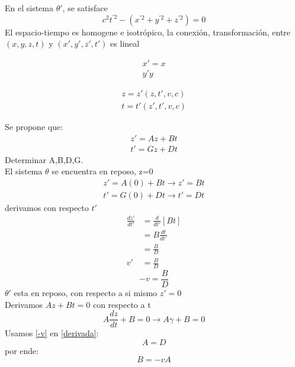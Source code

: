 \documentclass[12pt,letterpaper]{report}
\begin{document}
En el sistema $\theta'$, se satisface
\begin{equation*}
    c^{2}t^{'2}-(x^{'2}+y^{'2}+z^{'2})=0
\end{equation*}
El espacio-tiempo es homogene e isotrópico, la conexión, transformación, entre $(x,y,z,t)$ y $(x',y',z',t')$ es lineal\\
\begin{minipage}{0.5\linewidth}
\begin{eqnarray*}
    x'=x\\
    y'y
\end{eqnarray*}
\end{minipage}
\begin{minipage}{0.5\linewidth}
\begin{eqnarray*}
    z=z'(z,t',v,c)\\
    t=t'(z',t',v,c)
\end{eqnarray*}
\end{minipage}
Se propone que:
\begin{eqnarray}
    \label{sistema}
    z'=Az+Bt\\
    t'=Gz+Dt
    \label{sistemas}
\end{eqnarray}
Determinar A,B,D,G.\\
El sistema $\theta$ se encuentra en reposo, z=0
\begin{eqnarray}
    z'=A(0)+Bt \rightarrow z'=Bt \\
    t'=G(0)+Dt \rightarrow t'=Dt
\end{eqnarray}
derivamos con respecto $t'$
\begin{align*}
    \frac{dz'}{dt'} &=\frac{d}{dt'}[Bt]\\
                    &=B\frac{dt}{dt'}\\
                    & =\frac{B}{D}\\
                v'  &=\frac{B}{D}
\end{align*}
\begin{equation}
    -v=\frac{B}{D}
    \label{-v}
\end{equation}
$\theta'$ esta en reposo, con respecto a si mismo $z'=0$\\
Derivamos $Az+Bt=0$ con respecto a t
\begin{equation}
    A\frac{dz}{dt}+B=0 \rightarrow A\gamma +B=0
    \label{derivada}
\end{equation}
Usamos \ref{-v} en \ref{derivada}:
\begin{equation}
    A=D
    \label{A=D}
\end{equation}
por ende:
\begin{equation}
    B=-vA
    \label{B=-vA}
\end{equation}
\end{document}
